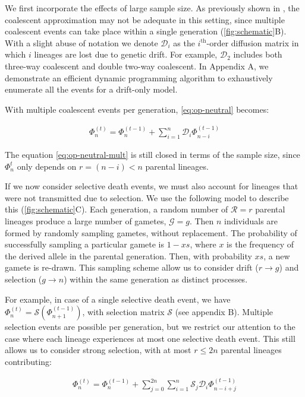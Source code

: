 \documentclass[review]{elsarticle}
\newcommand{\ra}{\rightarrow}
\begin{document}
We first incorporate the effects of large sample size. As previously shown in
\cite{BhaskarEtAl2014,NelsonEtAl2019}, the coalescent approximation may not be adequate in this
setting, since multiple coalescent events can take place within a single generation
(\ref{fig:schematic}B). With a slight abuse of notation we denote $\mathcal{D}_i$ as the
$i^{\text{th}}$-order diffusion matrix in which $i$ lineages are lost due to genetic drift. For
example, $\mathcal{D}_2$ includes both three-way coalescent and double two-way coalescent. In
Appendix A, we demonstrate an efficient dynamic programming algorithm to exhaustively enumerate all
the events for a drift-only model.

With multiple coalescent events per generation, \eqref{eq:op-neutral} becomes:

\begin{align}
  \label{eq:op-neutral-mult}
  \Phi_{n}^{(t)}=\Phi_{n}^{(t-1)}+\sum_{i=1}^{n}\mathcal{D}_i \Phi_{n-i}^{(t-1)}
\end{align}

The equation \eqref{eq:op-neutral-mult} is still closed in terms of the sample size, since
$\Phi_{n}^{t}$ only depends on $r=(n-i)<n$ parental lineages. 


If we now consider selective death events, we must also account for lineages that were not
transmitted due to selection. We use the following model to describe this (\ref{fig:schematic}C).
Each generation, a random number of $\mathcal{R}=r$ parental lineages produce a large number of
gametes, $\mathcal{G}=g$. Then $n$ individuals are formed by randomly sampling gametes, without
replacement. The probability of successfully sampling a particular gamete is $1-xs$, where $x$ is
the frequency of the derived allele in the parental generation. Then, with probability $xs$, a new
gamete is re-drawn. This sampling scheme allow us to consider drift ($r \ra g$) and selection ($g
\ra n$) within the same generation as distinct processes.
 
For example, in case of a single selective death event, we have
$\Phi_{n}^{(t)}=\mathcal{S}(\Phi_{n+1}^{(t-1)})$, with selection matrix $\mathcal{S}$ (see appendix
B). Multiple selection events are possible per generation, but we restrict our attention to the case
where each lineage experiences at most one selective death event. This still allows us to consider
strong selection, with at most $r\le 2n$ parental lineages contributing:

\begin{align}
  \label{eq:op-selection}
  \Phi_{n}^{(t)}=\Phi_{n}^{(t-1)}+ \sum_{j=0}^{2n} \sum_{i=1}^{n} \mathcal{S}_j \mathcal{D}_i \Phi_{n-i+j}^{(t-1)}
\end{align}
\end{document}
